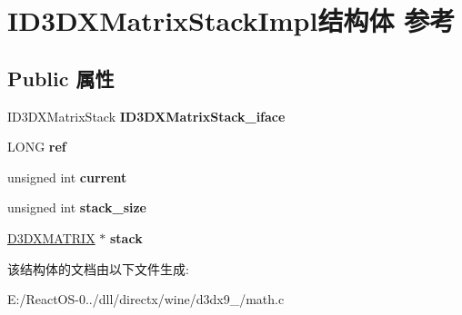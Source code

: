 \hypertarget{struct_i_d3_d_x_matrix_stack_impl}{}\section{I\+D3\+D\+X\+Matrix\+Stack\+Impl结构体 参考}
\label{struct_i_d3_d_x_matrix_stack_impl}
\subsection*{Public 属性}
\begin{DoxyCompactItemize}
\item 
\mbox{\label{struct_i_d3_d_x_matrix_stack_impl_a12a63d32bb20dd6806a46d6438392fd2}} 
I\+D3\+D\+X\+Matrix\+Stack {\bfseries I\+D3\+D\+X\+Matrix\+Stack\+\_\+iface}
\item 
\mbox{\label{struct_i_d3_d_x_matrix_stack_impl_a6e703555c994e53bd2e3aa62ef67754e}} 
L\+O\+NG {\bfseries ref}
\item 
\mbox{\label{struct_i_d3_d_x_matrix_stack_impl_a22876c3e862d423643c964f41fedd972}} 
unsigned int {\bfseries current}
\item 
\mbox{\label{struct_i_d3_d_x_matrix_stack_impl_a6159e401c2683a56063c0b4d65ca6a8e}} 
unsigned int {\bfseries stack\+\_\+size}
\item 
\mbox{\label{struct_i_d3_d_x_matrix_stack_impl_ad7fc9cacdde02a1c31cf0e2e4b9fe7c9}} 
\hyperlink{struct___d3_d_m_a_t_r_i_x}{D3\+D\+X\+M\+A\+T\+R\+IX} $\ast$ {\bfseries stack}
\end{DoxyCompactItemize}


该结构体的文档由以下文件生成\+:\begin{DoxyCompactItemize}
\item 
E\+:/\+React\+O\+S-\/0../dll/directx/wine/d3dx9\+\_/math.\+c\end{DoxyCompactItemize}
